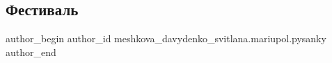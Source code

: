  
 
 
 
 
 
\subsection{Фестиваль}
\label{sec:29_04_2016.fb.meshkova_davydenko_svitlana.mariupol.pysanky.1.festival}
 
\ifcmt
 author_begin
   author_id meshkova_davydenko_svitlana.mariupol.pysanky
 author_end
\fi

